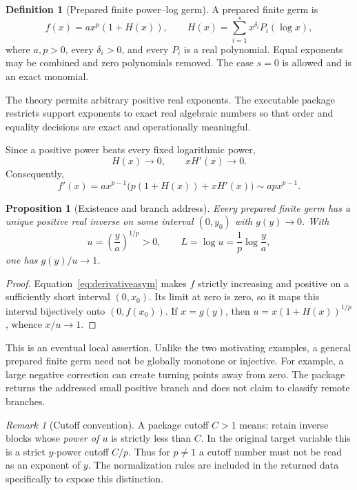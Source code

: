 \documentclass[11pt,a4paper]{article}
\numberwithin{equation}{section}
\newtheorem{proposition}[theorem]{Proposition}
\theoremstyle{definition}
\newtheorem{definition}[theorem]{Definition}
\theoremstyle{remark}
\newtheorem{remark}[theorem]{Remark}
\begin{document}
\begin{definition}[Prepared finite power--log germ]\label{def:class}
A prepared finite germ is
\begin{equation}\label{eq:class}
 f(x)=a x^p(1+H(x)),\qquad
 H(x)=\sum_{i=1}^s x^{\delta_i}P_i(\log x),
\end{equation}
where $a,p>0$, every $\delta_i>0$, and every $P_i$ is a real polynomial.
Equal exponents may be combined and zero polynomials removed. The case
$s=0$ is allowed and is an exact monomial.
\end{definition}

The theory permits arbitrary positive real exponents. The executable
package restricts support exponents to exact real algebraic numbers so
that order and equality decisions are exact and operationally meaningful.

Since a positive power beats every fixed logarithmic power,
\[
 H(x)\to0,\qquad xH'(x)\to0.
\]
Consequently,
\begin{equation}\label{eq:derivativeasym}
 f'(x)=a x^{p-1}\bigl(p(1+H(x))+xH'(x)\bigr)
 \sim apx^{p-1}.
\end{equation}

\begin{proposition}[Existence and branch address]\label{prop:branch}
Every prepared finite germ has a unique positive real inverse on some
interval $(0,y_0)$ with $g(y)\to0$. With
\begin{equation}\label{eq:uniformizer}
 u=\left(\frac ya\right)^{1/p}>0,\qquad
 L=\log u=\frac1p\log\frac ya,
\end{equation}
one has $g(y)/u\to1$.
\end{proposition}
\begin{proof}
Equation~\eqref{eq:derivativeasym} makes $f$ strictly increasing and positive
on a sufficiently short interval $(0,x_0)$. Its limit at zero is zero,
so it maps this interval bijectively onto $(0,f(x_0))$. If $x=g(y)$, then
$u=x(1+H(x))^{1/p}$, whence $x/u\to1$.
\end{proof}

This is an eventual local assertion. Unlike the two motivating examples,
a general prepared finite germ need not be globally monotone or injective.
For example, a large negative correction can create turning points away
from zero. The package returns the addressed small positive branch and
does not claim to classify remote branches.

\begin{remark}[Cutoff convention]
A package cutoff $C>1$ means: retain inverse blocks whose \emph{power of
$u$} is strictly less than $C$. In the original target variable this is a
strict $y$-power cutoff $C/p$. Thus for $p\ne1$ a cutoff number must not be
read as an exponent of $y$. The normalization rules are included in the
returned data specifically to expose this distinction.
\end{remark}
\end{document}
